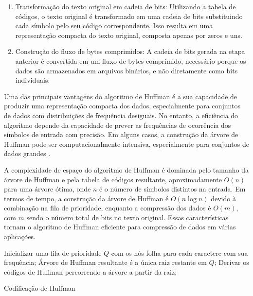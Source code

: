 \begin{enumerate}
    \item Transformação do texto original em cadeia de bits:
    \BlankLine
    Utilizando a tabela de códigos, o texto original é transformado em uma cadeia de bits substituindo cada símbolo pelo seu código correspondente. Isso resulta em uma representação compacta do texto original, composta apenas por zeros e uns.

    \item Construção do fluxo de bytes comprimidos:
    \BlankLine
    A cadeia de bits gerada na etapa anterior é convertida em um fluxo de bytes comprimido, necessário porque os dados são armazenados em arquivos binários, e não diretamente como bits individuais.
\end{enumerate}

Uma das principais vantagens do algoritmo de Huffman \cite{huffmanArticle} é a sua capacidade de produzir uma representação compacta dos dados, especialmente para conjuntos de dados com distribuições de frequência desiguais. No entanto, a eficiência do algoritmo depende da capacidade de prever as frequências de ocorrência dos símbolos de entrada com precisão. Em alguns casos, a construção da árvore de Huffman pode ser computacionalmente intensiva, especialmente para conjuntos de dados grandes \cite{huffmanArticle}.

A complexidade de espaço do algoritmo de Huffman é dominada pelo tamanho da árvore de Huffman e pela tabela de códigos resultante, aproximadamente \( O(n) \) para uma árvore ótima, onde \( n \) é o número de símbolos distintos na entrada. Em termos de tempo, a construção da árvore de Huffman é \( O(n \log n) \) devido à combinação na fila de prioridade, enquanto a compressão dos dados é \( O(m) \), com \( m \) sendo o número total de bits no texto original. Essas características tornam o algoritmo de Huffman eficiente para compressão de dados em várias aplicações.

\begin{algorithm}[H]
\SetAlgoLined
\DontPrintSemicolon


\BlankLine
Inicializar uma fila de prioridade $Q$ com os nós folha para cada caractere com sua frequência;
Árvore de Huffman resultante é a única raiz restante em $Q$;
Derivar os códigos de Huffman percorrendo a árvore a partir da raiz;

\caption{Codificação de Huffman}
\end{algorithm}

